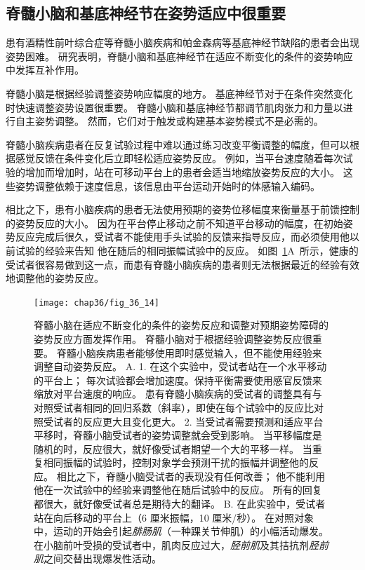 \subsection{脊髓小脑和基底神经节在姿势适应中很重要}

患有酒精性前叶综合症等脊髓小脑疾病和帕金森病等基底神经节缺陷的患者会出现姿势困难。
研究表明，脊髓小脑和基底神经节在适应不断变化的条件的姿势响应中发挥互补作用。


脊髓小脑是根据经验调整姿势响应幅度的地方。
基底神经节对于在条件突然变化时快速调整姿势设置很重要。
脊髓小脑和基底神经节都调节肌肉张力和力量以进行自主姿势调整。
然而，它们对于触发或构建基本姿势模式不是必需的。


脊髓小脑疾病患者在反复试验过程中难以通过练习改变平衡调整的幅度，但可以根据感觉反馈在条件变化后立即轻松适应姿势反应。
例如，当平台速度随着每次试验的增加而增加时，站在可移动平台上的患者会适当地缩放姿势反应的大小。
这些姿势调整依赖于速度信息，该信息由平台运动开始时的体感输入编码。


相比之下，患有小脑疾病的患者无法使用预期的姿势位移幅度来衡量基于前馈控制的姿势反应的大小。
因为在平台停止移动之前不知道平台移动的幅度，在初始姿势反应完成后很久，受试者不能使用手头试验的反馈来指导反应，而必须使用他以前试验的经验来告知 他在随后的相同振幅试验中的反应。
如图~\ref{fig:36_14}A~所示，健康的受试者很容易做到这一点，而患有脊髓小脑疾病的患者则无法根据最近的经验有效地调整他的姿势反应。


\begin{figure}[htbp]
	\centering
	\texttt{[image: chap36/fig\_36\_14]}
	\caption{脊髓小脑在适应不断变化的条件的姿势反应和调整对预期姿势障碍的姿势反应方面发挥作用。
		脊髓小脑对于根据经验调整姿势反应很重要。
		脊髓小脑疾病患者能够使用即时感觉输入，但不能使用经验来调整自动姿势反应\cite{horak1994cerebellar}。
		A. 1. 在这个实验中，受试者站在一个水平移动的平台上；
		每次试验都会增加速度。保持平衡需要使用感官反馈来缩放对平台速度的响应。
		患有脊髓小脑疾病的受试者的调整具有与对照受试者相同的回归系数（斜率），即使在每个试验中的反应比对照受试者的反应更大且变化更大。
		2. 当受试者需要预测和适应平台平移时，脊髓小脑受试者的姿势调整就会受到影响。
		当平移幅度是随机的时，反应很大，就好像受试者期望一个大的平移一样。
		当重复相同振幅的试验时，控制对象学会预测干扰的振幅并调整他的反应。
		相比之下，脊髓小脑受试者的表现没有任何改善；
		他不能利用他在一次试验中的经验来调整他在随后试验中的反应。
		所有的回复都很大，就好像受试者总是期待大的翻译。
		B. 在此实验中，受试者站在向后移动的平台上（6 厘米振幅，10 厘米/秒）。
		在对照对象中，运动的开始会引起\textit{腓肠肌}（一种踝关节伸肌）的小幅活动爆发。
		在小脑前叶受损的受试者中，肌肉反应过大，\textit{胫前肌}及其拮抗剂\textit{胫前肌}之间交替出现爆发性活动。}
	\label{fig:36_14}
\end{figure}


